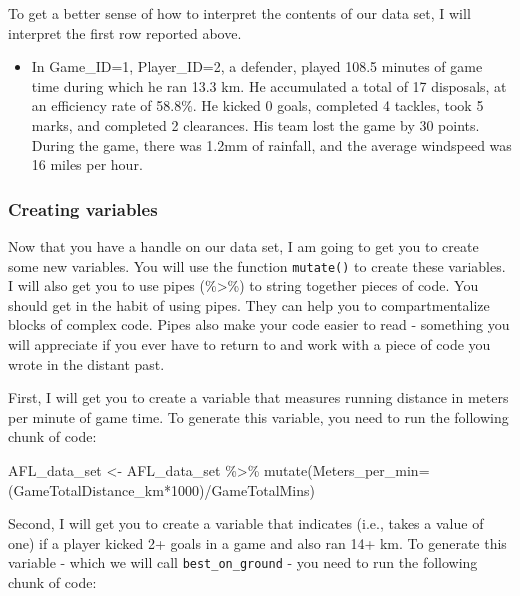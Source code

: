 \documentclass[
]{article}
\newenvironment{Shaded}{\begin{snugshade}}{\end{snugshade}}
\newcommand{\AttributeTok}[1]{\textcolor[rgb]{0.77,0.63,0.00}{#1}}
\newcommand{\DecValTok}[1]{\textcolor[rgb]{0.00,0.00,0.81}{#1}}
\newcommand{\FunctionTok}[1]{\textcolor[rgb]{0.00,0.00,0.00}{#1}}
\newcommand{\NormalTok}[1]{#1}
\newcommand{\OtherTok}[1]{\textcolor[rgb]{0.56,0.35,0.01}{#1}}
\newcommand{\SpecialCharTok}[1]{\textcolor[rgb]{0.00,0.00,0.00}{#1}}
\providecommand{\tightlist}{%
  \setlength{\itemsep}{0pt}\setlength{\parskip}{0pt}}
\begin{document}
To get a better sense of how to interpret the contents of our data set,
I will interpret the first row reported above.

\begin{itemize}
\tightlist
\item
  In Game\_ID=1, Player\_ID=2, a defender, played 108.5 minutes of game
  time during which he ran 13.3 km. He accumulated a total of 17
  disposals, at an efficiency rate of 58.8\%. He kicked 0 goals,
  completed 4 tackles, took 5 marks, and completed 2 clearances. His
  team lost the game by 30 points. During the game, there was 1.2mm of
  rainfall, and the average windspeed was 16 miles per hour.
\end{itemize}

\hypertarget{creating-variables}{%
\subsubsection{Creating variables}\label{creating-variables}}

Now that you have a handle on our data set, I am going to get you to
create some new variables. You will use the function \texttt{mutate()}
to create these variables. I will also get you to use pipes
(\%\textgreater\%) to string together pieces of code. You should get in
the habit of using pipes. They can help you to compartmentalize blocks
of complex code. Pipes also make your code easier to read - something
you will appreciate if you ever have to return to and work with a piece
of code you wrote in the distant past.

First, I will get you to create a variable that measures running
distance in meters per minute of game time. To generate this variable,
you need to run the following chunk of code:

\begin{Shaded}
\begin{Highlighting}[]
\NormalTok{AFL\_data\_set }\OtherTok{\textless{}{-}}\NormalTok{ AFL\_data\_set }\SpecialCharTok{\%\textgreater{}\%}
  \FunctionTok{mutate}\NormalTok{(}\AttributeTok{Meters\_per\_min=}\NormalTok{(GameTotalDistance\_km}\SpecialCharTok{*}\DecValTok{1000}\NormalTok{)}\SpecialCharTok{/}\NormalTok{GameTotalMins)}
\end{Highlighting}
\end{Shaded}

Second, I will get you to create a variable that indicates (i.e., takes
a value of one) if a player kicked 2+ goals in a game and also ran 14+
km. To generate this variable - which we will call
\texttt{best\_on\_ground} - you need to run the following chunk of code:
\end{document}
